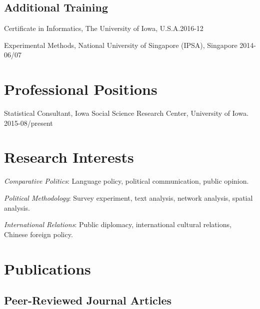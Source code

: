\documentclass[10.5pt,]{article}
\providecommand{\tightlist}{%
	\setlength{\itemsep}{0pt}\setlength{\parskip}{0pt}}
\renewenvironment{itemize}{
	\begin{list}{}{
			\setlength{\leftmargin}{1.5em}
		}
	}{
	\end{list}
}
\begin{document}
\subsection{Additional Training}\label{additional-training}

\begin{itemize}
\tightlist
\item
  Certificate in Informatics, The University of Iowa,
  U.S.A.\hfill 2016-12
\item
  Experimental Methods, National University of Singapore (IPSA),
  Singapore \hfill 2014-06/07
\end{itemize}

\section{Professional Positions}\label{professional-positions}

\begin{itemize}
\tightlist
\item
  Statistical Consultant, Iowa Social Science Research Center,
  University of Iowa. 2015-08/present
\end{itemize}

\section{Research Interests}\label{research-interests}

\begin{itemize}
\tightlist
\item
  \emph{Comparative Politics}: Language policy, political communication,
  public opinion.
\item
  \emph{Political Methodology}: Survey experiment, text analysis,
  network analysis, spatial analysis.
\item
  \emph{International Relations}: Public diplomacy, international
  cultural relations, Chinese foreign policy.
\end{itemize}

\section{Publications}\label{publications}

\subsection{Peer-Reviewed Journal
Articles}\label{peer-reviewed-journal-articles}
\end{document}
